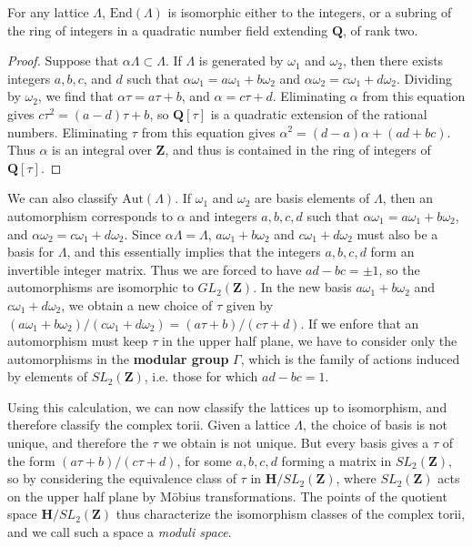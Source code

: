\begin{theorem}
    For any lattice $\Lambda$, $\text{End}(\Lambda)$ is isomorphic either to the integers, or a subring of the ring of integers in a quadratic number field extending $\mathbf{Q}$, of rank two.
\end{theorem}
\begin{proof}
    Suppose that $\alpha \Lambda \subset \Lambda$. If $\Lambda$ is generated by $\omega_1$ and $\omega_2$, then there exists integers $a,b,c$, and $d$ such that $\alpha \omega_1 = a \omega_1 + b \omega_2$ and $\alpha \omega_2 = c \omega_1 + d \omega_2$. Dividing by $\omega_2$, we find that $\alpha \tau = a \tau + b$, and $\alpha = c \tau + d$. Eliminating $\alpha$ from this equation gives $c \tau^2 = (a - d) \tau + b$, so $\mathbf{Q}[\tau]$ is a quadratic extension of the rational numbers. Eliminating $\tau$ from this equation gives $\alpha^2 = (d - a) \alpha + (ad + bc)$. Thus $\alpha$ is an integral over $\mathbf{Z}$, and thus is contained in the ring of integers of $\mathbf{Q}[\tau]$.
\end{proof}

We can also classify $\text{Aut}(\Lambda)$. If $\omega_1$ and $\omega_2$ are basis elements of $\Lambda$, then an automorphism corresponds to $\alpha$ and integers $a,b,c,d$ such that $\alpha \omega_1 = a \omega_1 + b \omega_2$, and $\alpha \omega_2 = c \omega_1 + d \omega_2$. Since $\alpha \Lambda = \Lambda$, $a \omega_1 + b \omega_2$ and $c \omega_1 + d \omega_2$ must also be a basis for $\Lambda$, and this essentially implies that the integers $a,b,c,d$ form an invertible integer matrix. Thus we are forced to have $ad - bc = \pm 1$, so the automorphisms are isomorphic to $GL_2(\mathbf{Z})$. In the new basis $a \omega_1 + b \omega_2$ and $c \omega_1 + d \omega_2$, we obtain a new choice of $\tau$ given by $(a \omega_1 + b \omega_2)/(c \omega_1 + d \omega_2) = (a \tau + b)/(c \tau + d)$. If we enfore that an automorphism must keep $\tau$ in the upper half plane, we have to consider only the automorphisms in the {\bf modular group} $\Gamma$, which is the family of actions induced by elements of $SL_2(\mathbf{Z})$, i.e. those for which $ad - bc = 1$.

Using this calculation, we can now classify the lattices up to isomorphism, and therefore classify the complex torii. Given a lattice $\Lambda$, the choice of basis is not unique, and therefore the $\tau$ we obtain is not unique. But every basis gives a $\tau$ of the form $(a\tau + b)/(c \tau + d)$, for some $a,b,c,d$ forming a matrix in $SL_2(\mathbf{Z})$, so by considering the equivalence class of $\tau$ in $\mathbf{H} / SL_2(\mathbf{Z})$, where $SL_2(\mathbf{Z})$ acts on the upper half plane by M\"{o}bius transformations. The points of the quotient space $\mathbf{H} / SL_2(\mathbf{Z})$ thus characterize the isomorphism classes of the complex torii, and we call such a space a {\it moduli space}.

